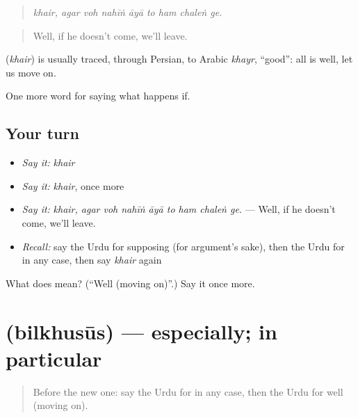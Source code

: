 \begin{quote}
\emph{khair, agar voh nahīṅ āyā to ham chaleṅ ge.}
\end{quote}

\begin{quote}
Well, if he doesn't come, we'll leave.
\end{quote}

\begin{cousinweb}
\textbf{} (\emph{khair}) is usually traced, through Persian, to Arabic \emph{khayr}, \textquotedblleft{}good\textquotedblright{}: all is well, let us move on.
\end{cousinweb}

\begin{grammarlens}[title={What you've built}]
One more word for saying what happens if.
\end{grammarlens}

\subsection*{Your turn}
\begin{itemize}
\raggedright
  \item \emph{Say it:} \emph{khair}
  \item \emph{Say it:} \emph{khair}, once more
  \item \emph{Say it:} \emph{khair, agar voh nahīṅ āyā to ham chaleṅ ge.} — Well, if he doesn't come, we'll leave.
  \item \emph{Recall:} say the Urdu for supposing (for argument's sake), then the Urdu for in any case, then say \emph{khair} again
\end{itemize}

\begin{tcolorbox}[breakable,colback=teal!4,colframe=teal!35!black,title={Before you move on}]
What does  mean? (\textquotedblleft{}Well (moving on)\textquotedblright{}.) Say it once more.
\end{tcolorbox}
\section[\texorpdfstring{\ur{بالخصوص} (bilkhusūs)}{بالخصوص (bilkhusūs)}]{ (bilkhusūs) — especially; in particular}

\label{lesson:UR-C542-bilkhusus}



\begin{quote}
Before the new one: say the Urdu for in any case, then the Urdu for well (moving on).
\end{quote}

